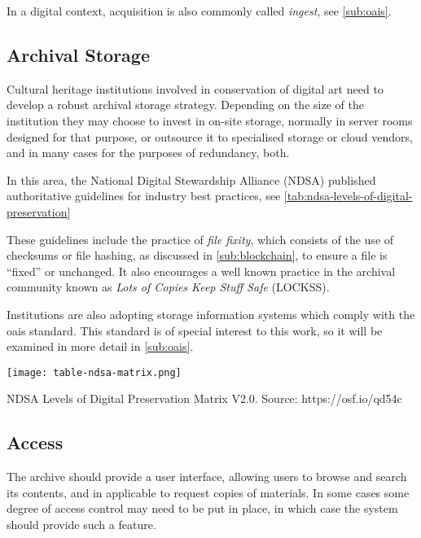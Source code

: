 In a digital context, acquisition is also commonly called \emph{ingest}, see \autoref{sub:oais}.

\subsection{Archival Storage}

Cultural heritage institutions involved in conservation of digital art need to develop a robust archival storage strategy. Depending on the size of the institution they may choose to invest in on-site storage, normally in server rooms designed for that purpose, or outsource it to specialised storage or cloud vendors, and in many cases for the purposes of redundancy, both.

In this area, the National Digital Stewardship Alliance (NDSA) published authoritative guidelines for industry best practices, see \autoref{tab:ndsa-levels-of-digital-preservation}

These guidelines include the practice of \emph{file fixity}, which consists of the use of checksums or file hashing, as discussed in \autoref{sub:blockchain}, to ensure a file is ``fixed'' or unchanged. It also encourages a well known practice in the archival community known as \emph{Lots of Copies Keep Stuff Safe} (LOCKSS).

Institutions are also adopting storage information systems which comply with the \gls{oais} standard. This standard is of special interest to this work, so it will be examined in more detail in \autoref{sub:oais}.

\begin{table}[h!]
\centering
\captionsetup{type=table} %
\texttt{[image: table-ndsa-matrix.png]} %
\caption[NDSA Levels of Digital Preservation Matrix V2.0]{NDSA Levels of Digital Preservation Matrix V2.0. Source: https://osf.io/qd54c}
\label{tab:ndsa-levels-of-digital-preservation}
\end{table}


\subsection{Access}

The archive should provide a user interface, allowing users to browse and search its contents, and in applicable to request copies of materials. In some cases some degree of access control may need to be put in place, in which case the system should provide such a feature. \cite{nationallibraryofaustraliaGuidelinesPreservationDigital2003}

